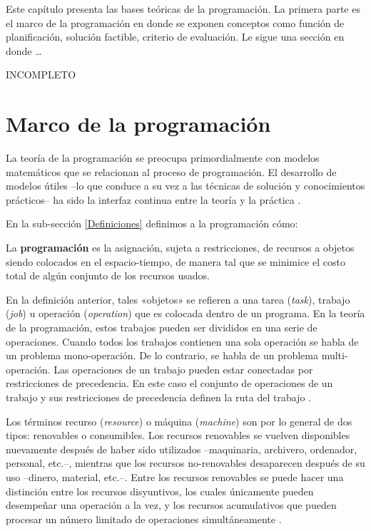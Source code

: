 \documentclass[spanish,draft,12pt,headsepline,footsepline,paper=letter]{scrreprt}
\renewenvironment{quotation}{\list{}{\leftmargin=0.25in}\item[]}{\endlist}
\begin{document}
Este capítulo presenta las bases teóricas de la programación. La primera parte es el marco de la programación en donde se exponen conceptos como función de planificación, solución factible, criterio de evaluación.
%
Le sigue una sección en donde \ldots

INCOMPLETO

\section{Marco de la programación}

La teoría de la programación se preocupa primordialmente con modelos matemáticos que se relacionan al proceso de programación. El desarrollo de modelos útiles –lo que conduce a su vez a las técnicas de solución y conocimientos prácticos– ha sido la interfaz continua entre la teoría y la práctica \citep[p.~3,~4]{Baker2009}. 

En la sub-sección \ref{Definiciones} definimos a la programación cómo:

\begin{quotation}
La \textbf{programación} es la asignación, sujeta a restricciones, de recursos a objetos siendo colocados en el espacio-tiempo, de manera tal que se minimice el costo total de algún conjunto de los recursos usados.
\end{quotation}

En la definición anterior, tales «objetos» se refieren a una tarea (\textit{task}), trabajo (\textit{job}) u operación (\textit{operation}) que es colocada dentro de un programa. En la teoría de la programación, estos trabajos pueden ser divididos en una serie de operaciones. Cuando todos los trabajos contienen una sola operación se habla de un problema mono-operación. De lo contrario, se habla de un problema multi-operación. Las operaciones de un trabajo pueden estar conectadas por restricciones de precedencia. En este caso el conjunto de operaciones de un trabajo y sus restricciones de precedencia definen la ruta del trabajo \citep[p.~5]{TKindt2002}.

Los términos recurso (\textit{resource}) o máquina (\textit{machine}) son por lo general de dos tipos: renovables o consumibles. Los recursos renovables se vuelven disponibles nuevamente después de haber sido utilizados –maquinaria, archivero, ordenador, personal, etc.–, mientras que los recursos no-renovables desaparecen después de su uso –dinero, material, etc.–. Entre los recursos renovables se puede hacer una distinción entre los recursos disyuntivos, los cuales únicamente pueden desempeñar una operación a la vez, y los recursos acumulativos que pueden procesar un número limitado de operaciones simultáneamente \citep[p.~6]{TKindt2002}.
\end{document}

